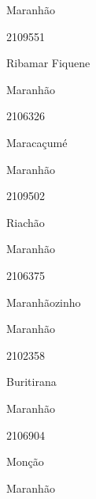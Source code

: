 \documentclass[
  letterpaper,
]{report}
\begin{document}
\n    

\n    

\n      

Maranhão

\n      

2109551

\n      

Ribamar Fiquene

\n    

\n    

\n      

Maranhão

\n      

2106326

\n      

Maracaçumé

\n    

\n    

\n      

Maranhão

\n      

2109502

\n      

Riachão

\n    

\n    

\n      

Maranhão

\n      

2106375

\n      

Maranhãozinho

\n    

\n    

\n      

Maranhão

\n      

2102358

\n      

Buritirana

\n    

\n    

\n      

Maranhão

\n      

2106904

\n      

Monção

\n    

\n    

\n      

Maranhão

\n      
\end{document}
